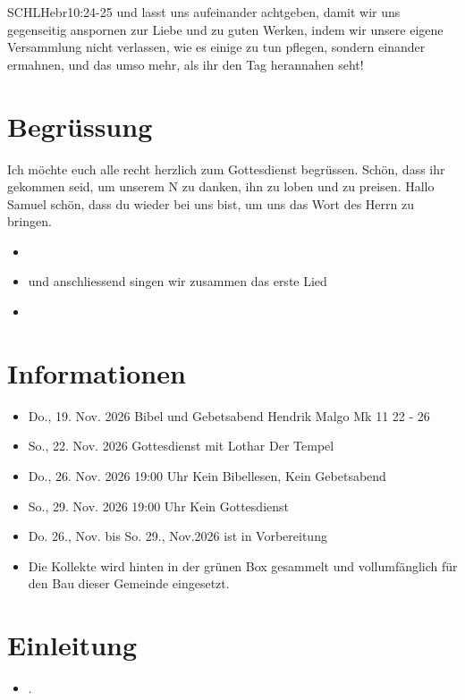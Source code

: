 \documentclass[fontsize=16pt]{mybib}
\author{OTS}
\newcommand{\Name}{Samuel}
\begin{document}
\begin{bibelbox}{SCHL}{Hebr}{10:24-25}
    und lasst uns aufeinander achtgeben, damit wir uns gegenseitig anspornen zur Liebe und zu guten Werken, indem wir unsere eigene Versammlung nicht verlassen, wie es einige zu tun pflegen, sondern einander ermahnen, und das umso mehr, als ihr den Tag herannahen seht!
\end{bibelbox}
\section{Begrüssung}
Ich möchte euch alle recht herzlich zum Gottesdienst begrüssen. Schön, dass ihr gekommen seid, um unserem \herr N zu danken, ihn zu loben und zu preisen. 
Hallo \Name{} schön, dass du wieder bei uns bist, um uns das Wort des Herrn zu bringen.

\begin{itemize}
    \item {}
    \item und anschliessend singen wir zusammen das erste Lied
    \item {}
\end{itemize}

\section{Informationen}
\begin{itemize}
    \item {} Do., 19. Nov. 2026 Bibel und Gebetsabend Hendrik Malgo Mk 11 22 - 26
    \item {} So., 22. Nov. 2026 Gottesdienst  mit Lothar Der Tempel
    \item {} Do., 26. Nov. 2026 19:00 Uhr Kein Bibellesen, Kein Gebetsabend
    \item {} So., 29. Nov. 2026 19:00 Uhr Kein Gottesdienst
    \item {} Do. 26., Nov. bis So. 29., Nov.2026 ist in Vorbereitung
    \item {} Die Kollekte wird hinten in der grünen Box gesammelt und vollumfänglich für den Bau dieser Gemeinde eingesetzt.
\end{itemize}
\section{Einleitung}

\begin{itemize}
    \item {}.
\end{itemize}
\end{document}
